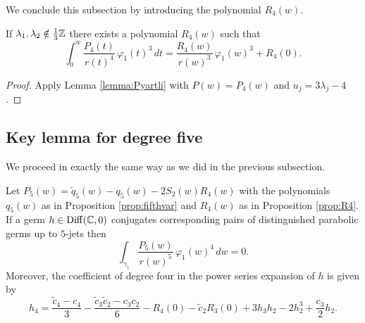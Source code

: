 We conclude this subsection by introducing the polynomial $R_4(w)$.
\begin{proposition}\label{prop:R4}
If $\lambda_1,\lambda_2\notin\frac{1}{3}\mathbb{Z}$ there exists a polynomial $R_4(w)$ such that 
\[ \int_0^w\frac{P_4(t)}{r(t)^4}\,\varphi_1(t)^3\,dt=\frac{R_4(w)}{r(w)^3}\,\varphi_1(w)^3+R_4(0). \]
\end{proposition}

\begin{proof}
Apply Lemma \ref{lemma:Pyartli} with $P(w)=P_4(w)$ and $u_j=3\lambda_j-4$. 
\end{proof}





\subsection{Key lemma for degree five}


We proceed in exactly the same way as we did in the previous subsection.

\begin{proposition}\label{prop:key5}
Let $P_5(w)=\tilde{q}_5(w)-q_5(w)-2S_2(w)R_4(w)$ with the polynomials $q_5(w)$ as in Proposition \textnormal{\ref{prop:fifthvar}} and $R_4(w)$ as in Proposition \textnormal{\ref{prop:R4}}. If a germ $h\in\operatorname{Diff}(\mathbb{C},0)$ conjugates corresponding pairs of distinguished parabolic germs up to $5$-jets then
\[ \int_{\gamma_1}\frac{P_5(w)}{r(w)^5}\,\varphi_1(w)^4\,dw=0. \]
Moreover, the coefficient of degree four in the power series expansion of $h$ is given by
\begin{equation}\label{eq:h4}
 h_4=\frac{\tilde{c}_4-c_4}{3}-\frac{\tilde{c}_3\tilde{c}_2-c_3c_2}{6}-R_4(0)-\tilde{c}_2R_3(0)+3h_3h_2-2h_2^3+\frac{c_3}{2}h_2. 
\end{equation}
\end{proposition}

